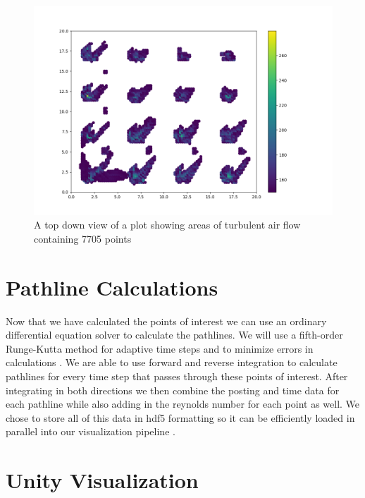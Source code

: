 \begin{figure}
\centering
\includegraphics[scale=.35]{Figures/Turb2D_4_11.png}
\decoRule
\caption[Turbulent Air Flow Scatter Plot]{A top down view of a plot showing areas of turbulent air flow containing 7705 points}
\label{fig:MTurbulentflow}
\end{figure}
\section{Pathline Calculations}

Now that we have calculated the points of interest we can use an ordinary differential equation solver to calculate the pathlines. We will use a fifth-order Runge-Kutta method for adaptive time steps and to minimize errors in calculations \cite{Teitzel1997}. We are able to use forward and reverse integration to calculate pathlines for every time step that passes through these points of interest. After integrating in both directions we then combine the posting and time data for each pathline while also adding in the reynolds number for each point as well. We chose to store all of this data in hdf5 formatting so it can be efficiently loaded in parallel into our visualization pipeline \cite{hdf5}.



\section{Unity Visualization}

